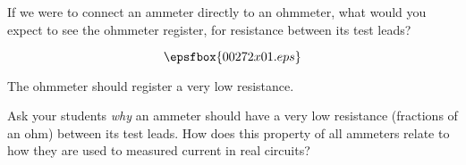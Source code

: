 

If we were to connect an ammeter directly to an ohmmeter, what would you expect to see the ohmmeter register, for resistance between its test leads?

$$\epsfbox{00272x01.eps}$$







The ohmmeter should register a very low resistance.







Ask your students {\it why} an ammeter should have a very low resistance (fractions of an ohm) between its test leads.  How does this property of all ammeters relate to how they are used to measured current in real circuits? 




